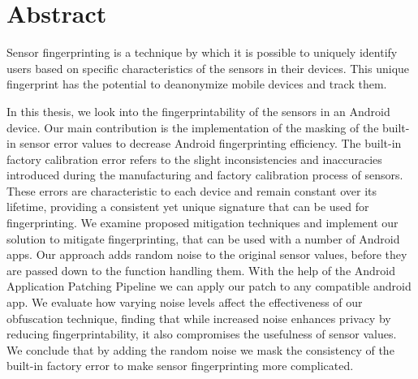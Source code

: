 \documentclass[11pt,
  oneside,openany,    %
]{scrreprt}
\begin{document}









\printthesistitle

\chapter*{Abstract}

Sensor fingerprinting is a technique by which it is possible to uniquely identify users based on specific characteristics of the sensors in their devices. 
This unique fingerprint has the potential to deanonymize mobile devices and track them.

In this thesis, we look into the fingerprintability of the sensors in an Android device.
Our main contribution is the implementation of the masking of the built-in sensor error values to decrease Android fingerprinting efficiency.
The built-in factory calibration error refers to the slight inconsistencies and inaccuracies introduced during the manufacturing and factory calibration process of sensors. 
These errors are characteristic to each device and remain constant over its lifetime, providing a consistent yet unique signature that can be used for fingerprinting.
We examine proposed mitigation techniques and implement our solution to mitigate fingerprinting, that can be used with a number of Android apps.
Our approach adds random noise to the original sensor values, before they are passed down to the function handling them.
With the help of the Android Application Patching Pipeline we can apply our patch to any compatible android app.
We evaluate how varying noise levels affect the effectiveness of our obfuscation technique, finding that while increased noise enhances privacy by reducing fingerprintability, it also compromises the usefulness of sensor values.
We conclude that by adding the random noise we mask the consistency of the built-in factory error to make sensor fingerprinting more complicated.
\end{document}
